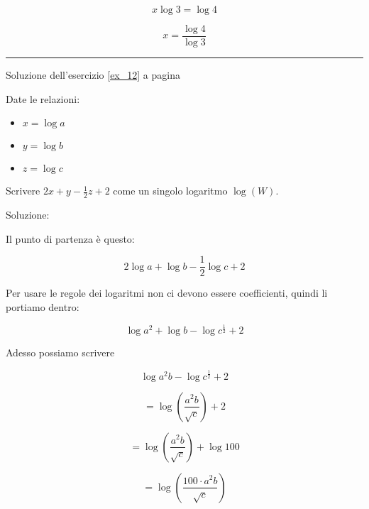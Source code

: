 \begin{equation*}
x\log3=\log4
\end{equation*}

\begin{equation*}
x=\frac{\log4}{\log3}
\end{equation*}

\vspace{1cm}
\hrule
\vspace{1cm}

Soluzione dell'esercizio \ref{ex_12} a pagina \pageref{ex_12}\label{sol_12}

Date le relazioni:

\begin{itemize}
\item $x = \log a$
\item $y = \log b$
\item $z = \log c$
\end{itemize}

Scrivere $2x+y-\frac{1}{2}z+2$ come un singolo logaritmo $\log(W)$.

Soluzione:

Il punto di partenza è questo:

\begin{equation*}
2\log a+\log b-\frac{1}{2}\log c+2
\end{equation*}

Per usare le regole dei logaritmi non ci devono essere coefficienti, quindi li portiamo dentro:

\begin{equation*}
\log a^2+\log b-\log c^{\frac{1}{2}}+2
\end{equation*}

Adesso possiamo scrivere

\begin{equation*}
\log a^2b-\log  c^{\frac{1}{2}}+2
\end{equation*}

\begin{equation*}
=\log\left(
\frac{
a^2b
}{
\sqrt{c}
}
\right)+2
\end{equation*}

\begin{equation*}
=\log\left(
\frac{
a^2b
}{
\sqrt{c}
}
\right)+\log100
\end{equation*}

\begin{equation*}
=\log\left(
\frac{
100\cdot a^2b
}{
\sqrt{c}
}
\right)
\end{equation*}



